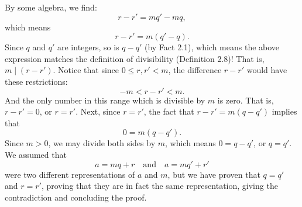 \documentclass{report}
\begin{document}
\begin{itemize}
            By some algebra, we find:
            \[
                r - r' = mq' - mq,
            \]
            which means
            \[
                r - r' = m(q' - q).
            \]
            \bigbreak \noindent 
            Since $q$ and $q'$ are integers, so is $q - q'$ (by Fact 2.1), which means the above expression matches the definition of divisibility (Definition 2.8)! That is, $m \mid (r - r')$.
            \bigbreak \noindent 
            Notice that since $0 \leq r, r' < m$, the difference $r - r'$ would have these restrictions:
            \[
                -m < r - r' < m.
            \]
            And the only number in this range which is divisible by $m$ is zero. That is, $r - r' = 0$, or $r = r'$.
            \bigbreak \noindent 
            Next, since $r = r'$, the fact that $r - r' = m(q - q')$ implies that
            \[
                0 = m(q - q').
            \]
            Since $m > 0$, we may divide both sides by $m$, which means $0 = q - q'$, or $q = q'$.
            \bigbreak \noindent 
            We assumed that
            \[
                a = mq + r \quad \text{and} \quad a = mq' + r'
            \]
            were two different representations of $a$ and $m$, but we have proven that $q = q'$ and $r = r'$, proving that they are in fact the same representation, giving the contradiction and concluding the proof.


    \end{itemize}

    \pagebreak 
\end{document}

